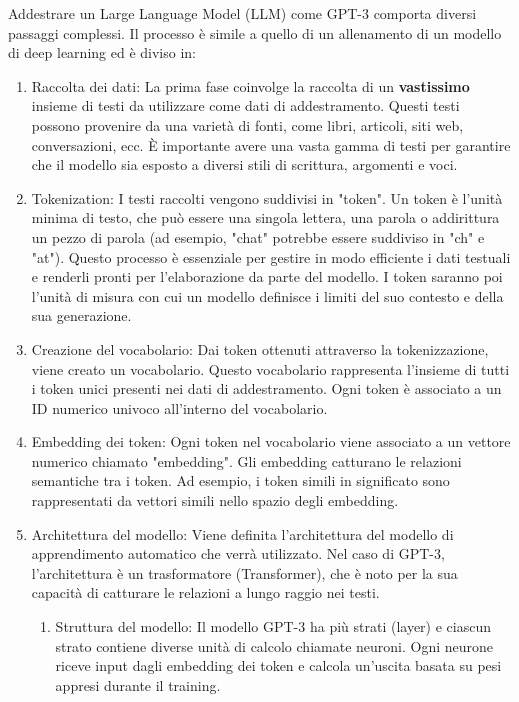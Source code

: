 Addestrare un Large Language Model (LLM) come GPT-3 comporta diversi passaggi complessi. 
Il processo è simile a quello di un allenamento di un modello di deep learning ed è diviso in:

\begin{enumerate}
    \item Raccolta dei dati: La prima fase coinvolge la raccolta di un \textbf{vastissimo} insieme di testi da utilizzare come dati di addestramento. Questi testi possono provenire da una varietà di fonti, come libri, articoli, siti web, conversazioni, ecc. È importante avere una vasta gamma di testi per garantire che il modello sia esposto a diversi stili di scrittura, argomenti e voci. 
    \item Tokenization: I testi raccolti vengono suddivisi in "token". Un token è l'unità minima di testo, che può essere una singola lettera, una parola o addirittura un pezzo di parola (ad esempio, "chat" potrebbe essere suddiviso in "ch" e "at"). Questo processo è essenziale per gestire in modo efficiente i dati testuali e renderli pronti per l'elaborazione da parte del modello. I token saranno poi l'unità di misura con cui un modello definisce i limiti del suo contesto e della sua generazione.
    \item Creazione del vocabolario: Dai token ottenuti attraverso la tokenizzazione, viene creato un vocabolario. Questo vocabolario rappresenta l'insieme di tutti i token unici presenti nei dati di addestramento. Ogni token è associato a un ID numerico univoco all'interno del vocabolario.
    \item Embedding dei token: Ogni token nel vocabolario viene associato a un vettore numerico chiamato "embedding". Gli embedding catturano le relazioni semantiche tra i token. Ad esempio, i token simili in significato sono rappresentati da vettori simili nello spazio degli embedding.
    \item Architettura del modello: Viene definita l'architettura del modello di apprendimento automatico che verrà utilizzato. Nel caso di GPT-3, l'architettura è un trasformatore (Transformer), che è noto per la sua capacità di catturare le relazioni a lungo raggio nei testi.
    \begin{enumerate} 
        \item Struttura del modello: Il modello GPT-3 ha più strati (layer) e ciascun strato contiene diverse unità di calcolo chiamate neuroni. Ogni neurone riceve input dagli embedding dei token e calcola un'uscita basata su pesi appresi durante il training. 

\end{enumerate}
\end{enumerate}
